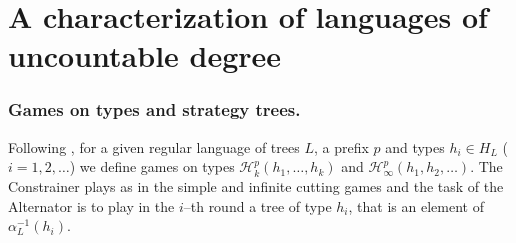 \section{A characterization of languages of uncountable degree}
\subsubsection*{Games on types and strategy trees.}
Following \cite{bp}, for a given regular language of trees $L$, a prefix $p$ and types $h_i\in H_L$ ($i=1,2,\dots$) we define games on types $\mathcal{H}^p_k(h_1,\dots,h_k)$ and $\mathcal{H}^p_\infty(h_1,h_2,\dots)$. The Constrainer plays as in the simple and infinite cutting games and the task of the Alternator is to play in the $i$--th round a tree of type $h_i$, that is an element of $\alpha_L^{-1}(h_i)$. %

